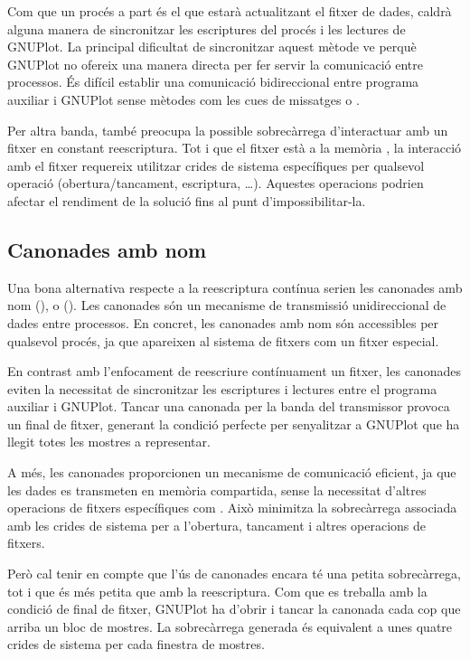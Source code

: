\documentclass{tfgitic}[2023/06/30]
\begin{document}
Com que un procés a part és el que estarà actualitzant el fitxer de
dades, caldrà alguna manera de sincronitzar les escriptures del procés
i les lectures de GNUPlot. La principal dificultat de sincronitzar
aquest mètode ve perquè GNUPlot no ofereix una manera directa per fer
servir la comunicació entre processos. És difícil establir una
comunicació bidireccional entre programa auxiliar i GNUPlot sense
mètodes com les cues de missatges \cite{cues-missatges} o
  \cite{sockets-unix}.

Per altra banda, també preocupa la possible sobrecàrrega d'interactuar
amb un fitxer en constant reescriptura. Tot i que el fitxer està a la
memòria , la interacció amb el fitxer requereix utilitzar
crides de sistema específiques per qualsevol operació
(obertura/tancament, escriptura, \dots). Aquestes
operacions podrien afectar el rendiment de la solució fins al punt
d'impossibilitar-la.

\subsection{Canonades amb nom}

Una bona alternativa respecte a la reescriptura contínua serien les
canonades amb nom (\cite[]{canonades-nom}), o
 (). Les canonades són un mecanisme
de transmissió unidireccional de dades entre processos. En concret,
les canonades amb nom són accessibles per qualsevol procés, ja que
apareixen al sistema de fitxers com un fitxer especial.

En contrast amb l'enfocament de reescriure contínuament un fitxer, les
canonades eviten la necessitat de sincronitzar les escriptures i
lectures entre el programa auxiliar i GNUPlot. Tancar una canonada per
la banda del transmissor provoca un final de fitxer, generant la
condició perfecte per senyalitzar a GNUPlot que ha llegit totes les
mostres a representar.

A més, les canonades proporcionen un mecanisme de comunicació
eficient, ja que les dades es transmeten en memòria compartida, sense
la necessitat d'altres operacions de fitxers específiques com
. Això minimitza la sobrecàrrega associada amb les crides
de sistema per a l'obertura, tancament i altres operacions de fitxers.

Però cal tenir en compte que l'ús de canonades encara té una petita
sobrecàrrega, tot i que és més petita que amb la reescriptura. Com que
es treballa amb la condició de final de fitxer, GNUPlot ha d'obrir i
tancar la canonada cada cop que arriba un bloc de mostres. La
sobrecàrrega generada és equivalent a unes quatre crides de sistema
per cada finestra de mostres.
\end{document}
